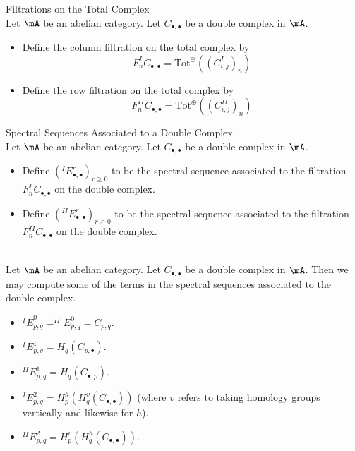 \documentclass[a4paper]{article}
\begin{document}
\begin{defn}{Filtrations on the Total Complex}{}\\
Let $\mA$ be an abelian category. Let $C_{\bullet,\bullet}$ be a double complex in $\mA$. 
\begin{itemize}
\item Define the column filtration on the total complex by $$F_n^IC_{\bullet,\bullet}=\text{Tot}^\oplus((C_{i,j}^I)_n)$$
\item Define the row filtration on the total complex by $$F_n^{II}C_{\bullet,\bullet}=\text{Tot}^\oplus((C_{i,j}^{II})_n)$$
\end{itemize}
\end{defn}

\begin{defn}{Spectral Sequences Associated to a Double Complex}{}\\
Let $\mA$ be an abelian category. Let $C_{\bullet,\bullet}$ be a double complex in $\mA$. 
\begin{itemize}
\item Define $({^I}E_{\bullet,\bullet}^r)_{r\geq 0}$ to be the spectral sequence associated to the filtration $F_n^IC_{\bullet,\bullet}$ on the double complex. 
\item Define $({^{II}}E_{\bullet,\bullet}^r)_{r\geq 0}$ to be the spectral sequence associated to the filtration $F_n^{II}C_{\bullet,\bullet}$ on the double complex. 
\end{itemize}
\end{defn}

\begin{eg}{}{}\\
Let $\mA$ be an abelian category. Let $C_{\bullet,\bullet}$ be a double complex in $\mA$. Then we may compute some of the terms in the spectral sequences associated to the double complex. 
\begin{itemize}
\item ${^IE}_{p,q}^0=^{II}E_{p,q}^0=C_{p,q}$. 
\item ${^I}E_{p,q}^1=H_q(C_{p,\bullet})$. 
\item ${^{II}}E_{p,q}^1=H_q(C_{\bullet,p})$. 
\item ${^I}E_{p,q}^2=H_p^h(H_q^v(C_{\bullet,\bullet}))$ (where $v$ refers to taking homology groups vertically and likewise for $h$). 
\item ${^{II}}E_{p,q}^2=H_p^v(H_q^h(C_{\bullet,\bullet}))$. 
\end{itemize}
\end{eg}
\end{document}
